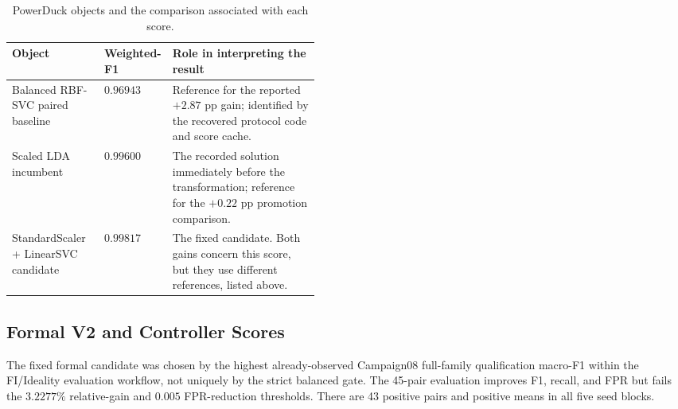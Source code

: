 \documentclass[manuscript,screen,nonacm]{acmart}
\begin{document}
\begin{table}[htbp]
\caption{PowerDuck objects and the comparison associated with each score.}
\label{tab:powerduck-comparators}
\centering
\begin{tabularx}{\linewidth}{>{\raggedright\arraybackslash}p{0.30\linewidth}>{\centering\arraybackslash}p{0.15\linewidth}>{\raggedright\arraybackslash}X}
\toprule
\textbf{Object} & \textbf{Weighted-F1} & \textbf{Role in interpreting the result} \\
\midrule
Balanced RBF-SVC paired baseline & $0.96943$ & Reference for the reported $+2.87$ pp gain; identified by the recovered protocol code and score cache. \\
Scaled LDA incumbent & $0.99600$ & The recorded solution immediately before the transformation; reference for the $+0.22$ pp promotion comparison. \\
StandardScaler + LinearSVC candidate & $0.99817$ & The fixed candidate. Both gains concern this score, but they use different references, listed above. \\
\bottomrule
\end{tabularx}
\end{table}

\subsection{Formal V2 and Controller Scores}
\label{sec:controller-audit}

The fixed formal candidate was chosen by the highest already-observed
Campaign08 full-family qualification macro-F1 within the FI/Ideality
evaluation workflow, not uniquely by the strict balanced gate.
The 45-pair evaluation improves F1, recall, and FPR but fails the
$3.2277\%$ relative-gain and $0.005$ FPR-reduction thresholds.
There are 43 positive pairs and positive means in all five seed blocks.
\end{document}
